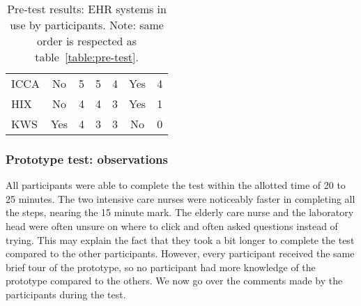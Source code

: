 \begin{table}[!t]
{\begin{tabular}{lcccccl}
        ICCA                & No              & 5                                                                     & 5                                                                          & 4                                                                         & Yes                                                               & 4                                                                                        \\
        HIX                 & No              & 4                                                                     & 4                                                                          & 3                                                                         & Yes                                                               & 1                                                                                        \\
        KWS                 & Yes             & 4                                                                     & 3                                                                          & 3                                                                         & No                                                                & 0
        \end{tabular}%
        }
        \caption{Pre-test results: EHR systems in use by participants. Note: same order is respected as table~\ref{table:pre-test}.}\label{table:pre-test-ehr}
    \end{table}

    \subsubsection{Prototype test: observations}

    All participants were able to complete the test within the allotted time of 20 to 25 minutes. The two intensive care nurses were noticeably faster in completing all the steps, nearing the 15 minute mark. The elderly care nurse and the laboratory head were often unsure on where to click and often asked questions instead of trying. This may explain the fact that they took a bit longer to complete the test compared to the other participants. However, every participant received the same brief tour of the prototype, so no participant had more knowledge of the prototype compared to the others. We now go over the comments made by the participants during the test.

